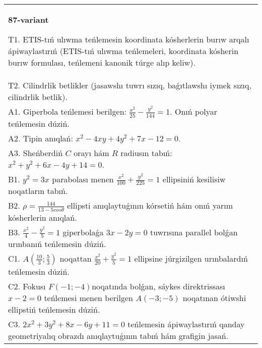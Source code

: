 \documentclass{article}
\begin{document}
\begin{tabular}{m{17cm}}
\textbf{87-variant}
\newline

T1. ETIS-tıń ulıwma teńlemesin koordinata kósherlerin burıw arqalı ápiwaylastırıń (ETIS-tıń ulıwma teńlemeleri, koordinata kósherin burıw formulası, teńlemeni kanonik túrge alıp keliw).\\

T2. Cilindrlik betlikler (jasawshı tuwrı sızıq, baǵıtlawshı iymek sızıq, cilindrlik betlik).\\

A1. Giperbola teńlemesi berilgen: $\frac{x^{2}}{25}-\frac{y^{2}}{144}=1$. Onıń polyar teńlemesin dúziń.\\

A2. Tipin anıqlań: $x^{2}-4 xy+4 y^{2}+7 x-12=0$.\\

A3. Sheńberdiń $C$ orayı hám $R$ radiusın tabıń: $x^2+y^2+6 x-4 y+14=0$.\\

B1. $y^{2} = 3x$ parabolası menen $\frac{x^{2}}{100} + \frac{y^{2}}{225} = 1$ ellipsiniń kesilisiw noqatların tabıń.  \\

B2. $\rho = \frac{144}{13 - 5cos\theta}$ ellipsti anıqlaytuǵının kórsetiń hám onıń yarım kósherlerin anıqlań.\\

B3. $\frac{x^{2}}{4} - \frac{y^{2}}{5} = 1$ giperbolaǵa $3x - 2y = 0$ tuwrısına parallel bolǵan urınbanıń teńlemesin dúziń.  \\

C1. $A(\frac{10}{3};\frac{5}{3})$ noqattan $\frac{x^{2}}{20} + \frac{y^{2}}{5} = 1$ ellipsine júrgizilgen urınbalardıń teńlemesin dúziń.  \\

C2. Fokusı $F( - 1; - 4)$noqatında bolǵan, sáykes direktrissası $x - 2 = 0$ teńlemesi menen berilgen $A( - 3; - 5)$ noqatınan ótiwshi ellipstiń teńlemesin dúziń.  \\

C3. $2x^{2} + 3y^{2} + 8x - 6y + 11 = 0$ teńlemesin ápiwaylastırıń qanday geometriyalıq obrazdı anıqlaytuǵının tabıń hám grafigin jasań.  \\

\end{tabular}
\vspace{1cm}
\end{document}
